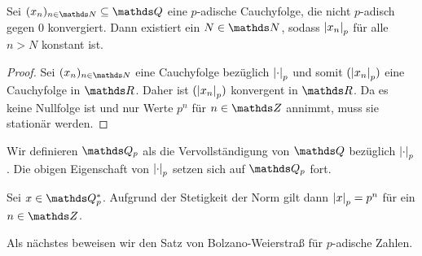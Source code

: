 
\begin{satz}
Sei $(x_n)_{n \in \N} \subseteq \Q$ eine $p$-adische Cauchyfolge, die nicht $p$-adisch gegen $0$ konvergiert.
Dann existiert ein $N \in \N$, sodass $\left\vert x_n\right\vert_p$ für alle $n>N$ konstant ist.
\begin{proof}
Sei $(x_n)_{n\in \N}$ eine Cauchyfolge bezüglich $\left\vert\cdot\right\vert_p$ und somit $(\left\vert x_n\right\vert_p)$ eine Cauchyfolge in $\R$.
Daher ist $(\left\vert x_n\right\vert_p)$ konvergent in $\R$. Da es keine Nullfolge ist und nur Werte $p^n$ für $n\in \Z$ annimmt, muss sie stationär werden.
\end{proof}
\end{satz}

\begin{defi}\label{def:Qp}
Wir definieren $\Q_p$ als die Vervollständigung von $\Q$ bezüglich $\left\vert\cdot\right\vert_p$.
Die obigen Eigenschaft von $\left\vert\cdot\right\vert_p$ setzen sich auf $\Q_p$ fort.
\end{defi}

\begin{bsp}
Sei $x\in \Q_p^\ast$. Aufgrund der Stetigkeit der Norm gilt dann $\left\vert x\right\vert_p=p^n$ für ein $n\in \Z$.
\end{bsp}
Als nächstes beweisen wir den Satz von Bolzano-Weierstraß für $p$-adische Zahlen.

